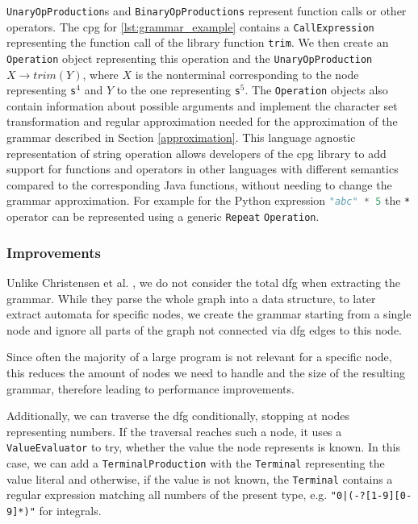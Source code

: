 \lstinline|UnaryOpProduction|s and \lstinline|BinaryOpProductions| represent function calls or other operators. The \ac{cpg} for \ref{lst:grammar_example} contains a \lstinline|CallExpression| representing the function call of the library function \lstinline|trim|. We then create an \lstinline|Operation| object representing this operation and the \lstinline|UnaryOpProduction| $X \rightarrow trim(Y)$, where $X$ is the nonterminal corresponding to the node representing \lstinline|s|$^4$ and $Y$ to the one representing \lstinline|s|$^5$. The \lstinline|Operation| objects also contain information about possible arguments and implement the character set transformation and regular approximation needed for the approximation of the grammar described in Section \ref{approximation}. This language agnostic representation of string operation allows developers of the \ac{cpg} library to add support for functions and operators in other languages with different semantics compared to the corresponding Java functions, without needing to change the grammar approximation. For example for the Python expression \lstinline[language=Python]|"abc" * 5| the \lstinline|*| operator can be represented using a generic \lstinline|Repeat| \lstinline|Operation|.

\subsubsection{Improvements}

Unlike Christensen et al. \cite{brics}, we do not consider the total \ac{dfg} when extracting the grammar. While they parse the whole graph into a data structure, to later extract automata for specific nodes, we create the grammar starting from a single node and ignore all parts of the graph not connected via \ac{dfg} edges to this node.

Since often the majority of a large program is not relevant for a specific node, this reduces the amount of nodes we need to handle and the size of the resulting grammar, therefore leading to performance improvements.

Additionally, we can traverse the \ac{dfg} conditionally, stopping at nodes representing numbers. If the traversal reaches such a node, it uses a \lstinline|ValueEvaluator| to try, whether the value the node represents is known. In this case, we can add a \lstinline|TerminalProduction| with the \lstinline|Terminal| representing the value literal and otherwise, if the value is not known, the \lstinline|Terminal| contains a regular expression matching all numbers of the present type, e.g. \lstinline{"0|(-?[1-9][0-9]*)"} for integrals.
	

